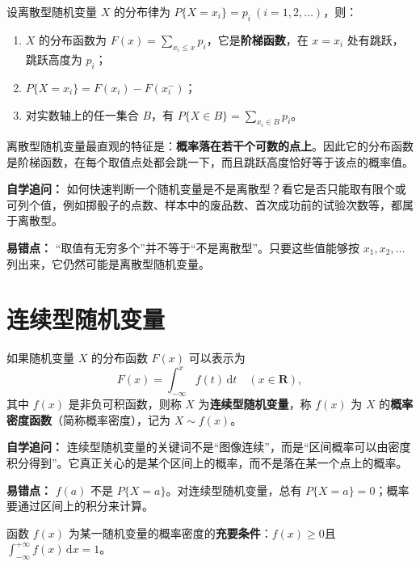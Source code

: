 ﻿\documentclass[lang=cn,11pt]{elegantbook}
\begin{document}
\begin{property}\label{prop:discrete-rv-df}
设离散型随机变量 $X$ 的分布律为 $P\{X = x_i\} = p_i\ (i=1,2,\dots)$，则：
\begin{enumerate}
    \item $X$ 的分布函数为 $\displaystyle F(x) = \sum_{x_i \le x} p_i$，它是\textbf{阶梯函数}，在 $x = x_i$ 处有跳跃，跳跃高度为 $p_i$；
    \item $P\{X = x_i\} = F(x_i) - F(x_i^-)$；
    \item 对实数轴上的任一集合 $B$，有 $\displaystyle P\{X \in B\} = \sum_{x_i \in B} p_i$。
\end{enumerate}
\end{property}

\begin{note}
离散型随机变量最直观的特征是：\textbf{概率落在若干个可数的点上}。因此它的分布函数是阶梯函数，在每个取值点处都会跳一下，而且跳跃高度恰好等于该点的概率值。

\textbf{自学追问：} 如何快速判断一个随机变量是不是离散型？看它是否只能取有限个或可列个值，例如掷骰子的点数、样本中的废品数、首次成功前的试验次数等，都属于离散型。

\textbf{易错点：} “取值有无穷多个”并不等于“不是离散型”。只要这些值能够按 \(x_1,x_2,\dots\) 列出来，它仍然可能是离散型随机变量。
\end{note}

\section{连续型随机变量}

\begin{definition}[连续型随机变量] \label{def:continuous-rv}
如果随机变量 $X$ 的分布函数 $F(x)$ 可以表示为
\[
F(x) = \int_{-\infty}^{x} f(t)\,\mathrm{d}t \quad (x \in \mathbf{R}),
\]
其中 $f(x)$ 是非负可积函数，则称 $X$ 为\textbf{连续型随机变量}，称 $f(x)$ 为 $X$ 的\textbf{概率密度函数}（简称概率密度），记为 $X \sim f(x)$。
\end{definition}

\begin{note}
\textbf{自学追问：} 连续型随机变量的关键词不是“图像连续”，而是“区间概率可以由密度积分得到”。它真正关心的是某个区间上的概率，而不是落在某一个点上的概率。

\textbf{易错点：} \(f(a)\) 不是 \(P\{X=a\}\)。对连续型随机变量，总有 \(P\{X=a\}=0\)；概率要通过区间上的积分来计算。
\end{note}
\begin{property}\label{prop:pdf-property}
函数 $f(x)$ 为某一随机变量的概率密度的\textbf{充要条件}：$f(x) \ge 0$且 $\displaystyle\int_{-\infty}^{+\infty} f(x)\,\mathrm{d}x = 1$。
\end{property}
\end{document}
